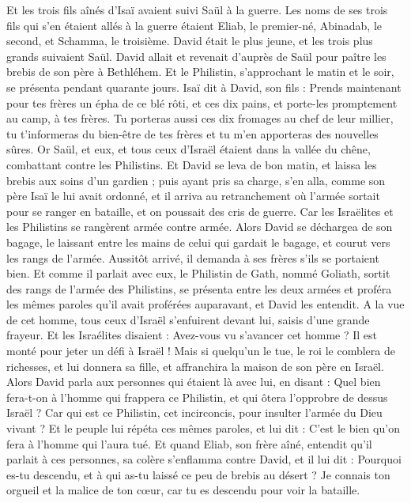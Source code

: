 \begin{multicols}{2}
Et les trois fils aînés d'Isaï avaient suivi Saül à la guerre. Les noms de ses trois fils qui s'en étaient allés à la guerre étaient Eliab, le premier-né, Abinadab, le second, et Schamma, le troisième.
David était le plus jeune, et les trois plus grands suivaient Saül.
David allait et revenait d'auprès de Saül pour paître les brebis de son père à Bethléhem.
Et le Philistin, s'approchant le matin et le soir, se présenta pendant quarante jours.
Isaï dit à David, son fils : Prends maintenant pour tes frères un épha de ce blé rôti, et ces dix pains, et porte-les promptement au camp, à tes frères.
Tu porteras aussi ces dix fromages au chef de leur millier, tu t'informeras du bien-être de tes frères et tu m'en apporteras des nouvelles sûres.
Or Saül, et eux, et tous ceux d'Israël étaient dans la vallée du chêne, combattant contre les Philistins.
Et David se leva de bon matin, et laissa les brebis aux soins d'un gardien ; puis ayant pris sa charge, s'en alla, comme son père Isaï le lui avait ordonné, et il arriva au retranchement où l'armée sortait pour se ranger en bataille, et on poussait des cris de guerre.
Car les Israëlites et les Philistins se rangèrent armée contre armée.
Alors David se déchargea de son bagage, le laissant entre les mains de celui qui gardait le bagage, et courut vers les rangs de l'armée. Aussitôt arrivé, il demanda à ses frères s'ils se portaient bien.
Et comme il parlait avec eux, le Philistin de Gath, nommé Goliath, sortit des rangs de l'armée des Philistins, se présenta entre les deux armées et proféra les mêmes paroles qu'il avait proférées auparavant, et David les entendit.
A la vue de cet homme, tous ceux d'Israël s'enfuirent devant lui, saisis d'une grande frayeur.
Et les Israélites disaient : Avez-vous vu s'avancer cet homme ? Il est monté pour jeter un défi à Israël ! Mais si quelqu'un le tue, le roi le comblera de richesses, et lui donnera sa fille, et affranchira la maison de son père en Israël.
Alors David parla aux personnes qui étaient là avec lui, en disant : Quel bien fera-t-on à l'homme qui frappera ce Philistin, et qui ôtera l'opprobre de dessus Israël ? Car qui est ce Philistin, cet incirconcis, pour insulter l'armée du Dieu vivant ?
Et le peuple lui répéta ces mêmes paroles, et lui dit : C'est le bien qu'on fera à l'homme qui l'aura tué.
Et quand Eliab, son frère aîné, entendit qu'il parlait à ces personnes, sa colère s'enflamma contre David, et il lui dit : Pourquoi es-tu descendu, et à qui as-tu laissé ce peu de brebis au désert ? Je connais ton orgueil et la malice de ton cœur, car tu es descendu pour voir la bataille.

\end{multicols}
